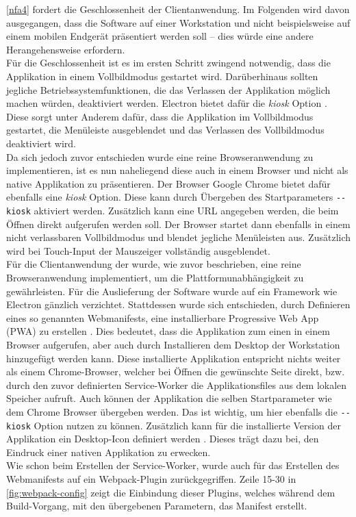 \ref{nfa4} fordert die Geschlossenheit der Clientanwendung. Im Folgenden wird davon ausgegangen, 
dass die Software auf einer Workstation und nicht beispielsweise auf einem mobilen Endgerät präsentiert
werden soll -- dies würde eine andere Herangehensweise erfordern.\\
Für die Geschlossenheit ist es im ersten Schritt zwingend notwendig, dass die Applikation in einem 
Vollbildmodus gestartet wird. Darüberhinaus sollten jegliche Betriebssystemfunktionen, die das 
Verlassen der Applikation möglich machen würden, deaktiviert werden. Electron bietet dafür
die \emph{kiosk} Option \cite{electron-browserWindow}. 
Diese sorgt unter Anderem dafür, dass die Applikation im Vollbildmodus gestartet, 
die Menüleiste ausgeblendet und das Verlassen des Vollbildmodus deaktiviert wird.\\
Da sich jedoch zuvor entschieden wurde eine reine Browseranwendung zu implementieren, ist es nun naheliegend 
diese auch in einem Browser und nicht als native Applikation zu präsentieren. Der Browser Google Chrome bietet
dafür ebenfalls eine \emph{kiosk} Option. Diese kann durch Übergeben des Startparameters \texttt{-{}-kiosk}
aktiviert werden. Zusätzlich kann eine URL angegeben werden, die beim Öffnen direkt aufgerufen werden soll.
Der Browser startet dann ebenfalls in einem nicht verlassbaren Vollbildmodus und blendet jegliche Menüleisten aus.
Zusätzlich wird bei Touch-Input der Mauszeiger vollständig ausgeblendet.\\

Für die Clientanwendung der \shst{} wurde, wie zuvor beschrieben, eine reine Browseranwendung implementiert,
um die Plattformunabhängigkeit zu gewährleisten. Für die Auslieferung der Software wurde auf ein Framework wie
Electron gänzlich verzichtet. Stattdessen wurde sich entschieden, durch Definieren eines so genannten Webmanifests,
eine installierbare Progressive Web App (PWA) zu erstellen \cite{web-app-manifest}. Dies bedeutet, 
dass die Applikation zum einen in einem Browser aufgerufen, aber auch durch Installieren dem Desktop 
der Workstation hinzugefügt werden kann. Diese installierte Applikation entspricht nichts 
weiter als einem Chrome-Browser, welcher bei Öffnen die gewünschte Seite direkt,
bzw. durch den zuvor definierten Service-Worker die Applikationsfiles aus dem lokalen Speicher aufruft. Auch
können der Applikation die selben Startparameter wie dem Chrome Browser übergeben werden. Das ist wichtig,
um hier ebenfalls die \texttt{-{}-kiosk} Option nutzen zu können.
Zusätzlich kann für die installierte Version der Applikation ein Desktop-Icon definiert werden \cite{web-app-manifest}.
Dieses trägt dazu bei, den Eindruck einer nativen Applikation zu erwecken.\\
Wie schon beim Erstellen der Service-Worker, wurde auch für das Erstellen des Webmanifests auf ein 
Webpack-Plugin \cite{webpack-pwa-manifest-plugin} zurückgegriffen. Zeile 15-30 in \autoref{fig:webpack-config} 
zeigt die Einbindung dieser Plugins, welches während dem Build-Vorgang, mit den übergebenen Parametern, das Manifest erstellt. 
